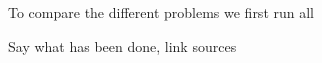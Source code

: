\documentclass{article}
\begin{document}
To compare the different problems we first run all

Say what has been done, link sources
\end{document}
